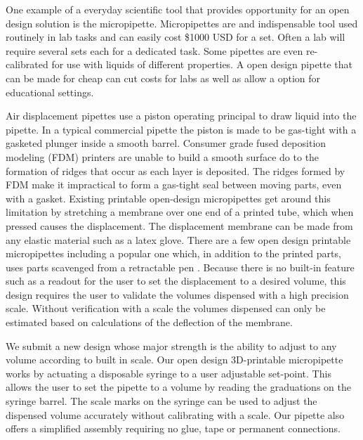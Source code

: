 \documentclass[10pt,letterpaper]{article}
\begin{document}
One example of a everyday scientific tool that provides opportunity for an open design solution is the micropipette.
Micropipettes are and indispensable tool used routinely in lab tasks and can easily cost \$1000 USD for a set.
Often a lab will require several sets each for a dedicated task.
Some pipettes are even re-calibrated for use with liquids of different properties.
A open design pipette that can be made for cheap can cut costs for labs as well as allow a option for educational settings.

Air displacement pipettes use a piston operating principal to draw liquid into the pipette\cite{ISO2002}.
In a typical commercial pipette the piston is made to be gas-tight with a gasketed plunger inside a smooth barrel.
Consumer grade fused deposition modeling (FDM) printers are unable to build a smooth surface do to the formation of ridges that occur as each layer is deposited.
The ridges formed by FDM make it impractical to form a gas-tight seal between moving parts, even with a gasket.
Existing printable open-design micropipettes get around this limitation by stretching a membrane over one end of a printed tube, which when pressed causes the displacement.
The displacement membrane can be made from any elastic material such as a latex glove.
There are a few open design printable micropipettes including a popular one which, in addition to the printed parts, uses parts scavenged from a retractable pen \cite{Baden2014}.
Because there is no built-in feature such as a readout for the user to set the displacement to a desired volume, this design requires the user to validate the volumes dispensed with a high precision scale.
Without verification with a scale the volumes dispensed can only be estimated based on calculations of the deflection of the membrane.

We submit a new design whose major strength is the ability to adjust to any volume according to built in scale.
Our open design 3D-printable micropipette works by actuating a disposable syringe to a user adjustable set-point.
This allows the user to set the pipette to a volume by reading the graduations on the syringe barrel.
The scale marks on the syringe can be used to adjust the dispensed volume accurately without calibrating with a scale.
Our pipette also offers a simplified assembly requiring no glue, tape or permanent connections.

\end{document}
